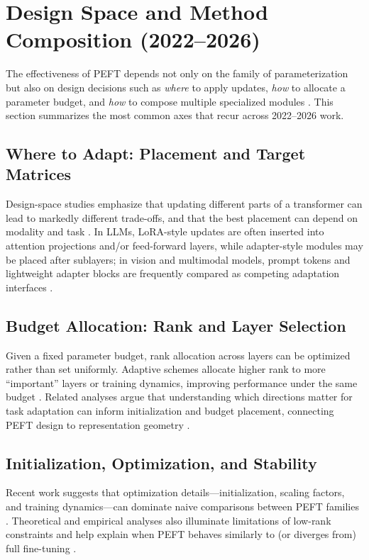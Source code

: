 \documentclass[conference]{IEEEtran}
\begin{document}
\section{Design Space and Method Composition (2022--2026)}
The effectiveness of PEFT depends not only on the family of parameterization but also on design decisions such as \emph{where} to apply updates, \emph{how} to allocate a parameter budget, and \emph{how} to compose multiple specialized modules \cite{chen2023parameter,han2024parameter}. This section summarizes the most common axes that recur across 2022--2026 work.

\subsection{Where to Adapt: Placement and Target Matrices}
Design-space studies emphasize that updating different parts of a transformer can lead to markedly different trade-offs, and that the best placement can depend on modality and task \cite{chen2023parameter,xin2024parameter}. In LLMs, LoRA-style updates are often inserted into attention projections and/or feed-forward layers, while adapter-style modules may be placed after sublayers; in vision and multimodal models, prompt tokens and lightweight adapter blocks are frequently compared as competing adaptation interfaces \cite{hu2021lora,houlsby2019parameter,jia2022visual,chen2022adaptformer}.

\subsection{Budget Allocation: Rank and Layer Selection}
Given a fixed parameter budget, rank allocation across layers can be optimized rather than set uniformly. Adaptive schemes allocate higher rank to more ``important'' layers or training dynamics, improving performance under the same budget \cite{zhang2023adalora,liu2024dora}. Related analyses argue that understanding which directions matter for task adaptation can inform initialization and budget placement, connecting PEFT design to representation geometry \cite{si2024task,afzal2026linearization}.

\subsection{Initialization, Optimization, and Stability}
Recent work suggests that optimization details---initialization, scaling factors, and training dynamics---can dominate naive comparisons between PEFT families \cite{wang2024lora,meng2024periodiclora}. Theoretical and empirical analyses also illuminate limitations of low-rank constraints and help explain when PEFT behaves similarly to (or diverges from) full fine-tuning \cite{hu2024computational,afzal2026linearization}.
\end{document}
